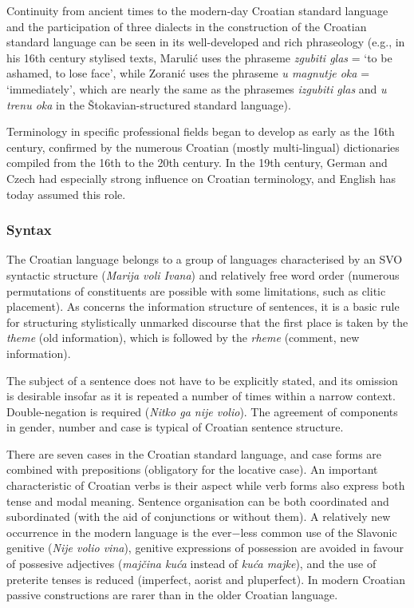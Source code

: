 \begin{multicols}{2}
Continuity from ancient times to the modern-day Croatian standard language and the participation of three dialects in the construction of the Croatian standard language can be seen in its well-developed and rich phraseology (e.g., in his 16th century stylised texts, Marulić uses the phraseme \emph{zgubiti glas} = ‘to be ashamed, to lose face’, while Zoranić uses the phraseme \emph{u magnutje oka} = ‘immediately’, which are nearly the same as the phrasemes \emph{izgubiti glas} and \emph{u trenu oka} in the Štokavian-structured standard language).

Terminology in specific professional fields began to develop as early as the 16th century, confirmed by the numerous Croatian (mostly multi-lingual) dictionaries compiled from the 16th to the 20th century. In the 19th century, German and Czech had especially strong influence on Croatian terminology, and English has today assumed this role.


\subsubsection{Syntax}

The Croatian language belongs to a group of languages characterised by an SVO syntactic structure (\emph{Marija voli Ivana}) and relatively free word order (numerous permutations of constituents are possible with some limitations, such as clitic placement). As concerns the information structure of sentences, it is a basic rule for structuring stylistically unmarked discourse that the first place is taken by the \emph{theme} (old information), which is followed by the \emph{rheme} (comment, new information).

The subject of a sentence does not have to be explicitly stated, and its omission is desirable insofar as it is repeated a number of times within a narrow context. Double-negation is required (\emph{Nitko ga nije volio}). The agreement of components in gender, number and case is typical of Croatian sentence structure.

There are seven cases in the Croatian standard language, and case forms are combined with prepositions (obligatory for the locative case). An important characteristic of Croatian verbs is their aspect while verb forms also express both tense and modal meaning. Sentence organisation can be both coordinated and subordinated (with the aid of conjunctions or without them). A relatively new occurrence in the modern language is the ever$-$less common use of the Slavonic genitive (\emph{Nije volio vina}), genitive expressions of possession are avoided in favour of possesive adjectives (\emph{majčina kuća} instead of \emph{kuća majke}), and the use of preterite tenses is reduced (imperfect, aorist and pluperfect). In modern Croatian passive constructions are rarer than in the older Croatian language.



\end{multicols}
